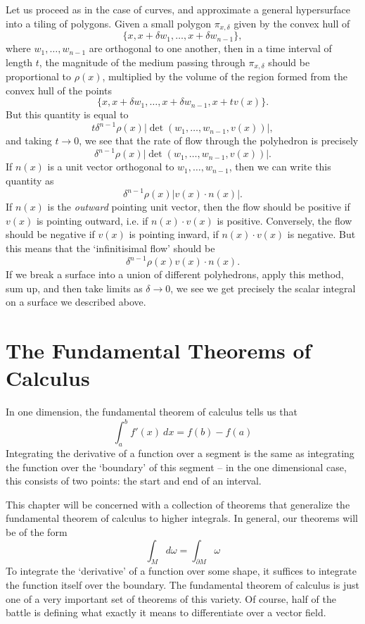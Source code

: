 Let us proceed as in the case of curves, and approximate a general hypersurface into a tiling of polygons. Given a small polygon $\pi_{x,\delta}$ given by the convex hull of
%
\[ \{ x, x + \delta w_1, \dots, x + \delta w_{n-1} \}, \]
%
where $w_1,\dots,w_{n-1}$ are orthogonal to one another, then in a time interval of length $t$, the magnitude of the medium passing through $\pi_{x,\delta}$ should be proportional to $\rho(x)$, multiplied by the volume of the region formed from the convex hull of the points
%
\[ \{ x, x + \delta w_1, \dots, x + \delta w_{n-1}, x + t v(x) \}. \]
%
But this quantity is equal to
%
\[ t \delta^{n-1} \rho(x) |\det(w_1,\dots,w_{n-1}, v(x))|, \]
%
and taking $t \to 0$, we see that the rate of flow through the polyhedron is precisely
%
\[ \delta^{n-1} \rho(x) |\det(w_1,\dots,w_{n-1},v(x))|. \]
%
If $n(x)$ is a unit vector orthogonal to $w_1,\dots,w_{n-1}$, then we can write this quantity as
%
\[ \delta^{n-1} \rho(x) |v(x) \cdot n(x)|. \]
%
If $n(x)$ is the \emph{outward} pointing unit vector, then the flow should be positive if $v(x)$ is pointing outward, i.e. if $n(x) \cdot v(x)$ is positive. Conversely, the flow should be negative if $v(x)$ is pointing inward, if $n(x) \cdot v(x)$ is negative. But this means that the `infinitisimal flow' should be
%
\[ \delta^{n-1} \rho(x) v(x) \cdot n(x). \]
%
If we break a surface into a union of different polyhedrons, apply this method, sum up, and then take limits as $\delta \to 0$, we see we get precisely the scalar integral on a surface we described above.






\section{The Fundamental Theorems of Calculus}

In one dimension, the fundamental theorem of calculus tells us that
%
\[ \int_a^b f'(x)\ dx = f(b) - f(a) \]
%
Integrating the derivative of a function over a segment is the same as integrating the function over the `boundary' of this segment -- in the one dimensional case, this consists of two points: the start and end of an interval.

This chapter will be concerned with a collection of theorems that generalize the fundamental theorem of calculus to higher integrals. In general, our theorems will be of the form
%
\[ \int_M d\omega = \int_{\partial M} \omega \]
%
To integrate the `derivative' of a function over some shape, it suffices to integrate the function itself over the boundary. The fundamental theorem of calculus is just one of a very important set of theorems of this variety. Of course, half of the battle is defining what exactly it means to differentiate over a vector field.

